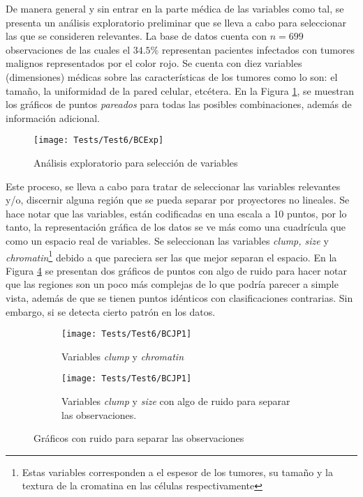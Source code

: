 \documentclass[../Main/Main.tex]{subfiles}
\begin{document}
De manera general y sin entrar en la parte médica de las variables como tal, se presenta un análisis exploratorio preliminar que se lleva a cabo para seleccionar las que se consideren relevantes. La base de datos cuenta con $n = 699$ observaciones de las cuales el $34.5\%$ representan pacientes infectados con tumores malignos representados por el color rojo. Se cuenta con diez variables (dimensiones) médicas sobre las características de los tumores como lo son: el tamaño, la uniformidad de la pared celular, etcétera. En la Figura \ref{fig:BCExp}, se muestran los gráficos de puntos \textit{pareados} para todas las posibles combinaciones, además de información adicional.
\begin{figure}[h]
	\centering
	\texttt{[image: Tests/Test6/BCExp]}
	\caption{Análisis exploratorio para selección de variables}
	\label{fig:BCExp}
\end{figure}
Este proceso, se lleva a cabo para tratar de seleccionar las variables relevantes y/o, discernir alguna región que se pueda separar por proyectores no lineales. Se hace notar que las variables, están codificadas en una escala a 10 puntos, por lo tanto, la representación gráfica de los datos se ve más como una cuadrícula que como un espacio real de variables. Se seleccionan las variables \textit{clump, size} y \textit{chromatin}\footnote{Estas variables corresponden a el espesor de los tumores, su tamaño y la textura de la cromatina en las células respectivamente} debido a que pareciera ser las que mejor separan el espacio. En la Figura \ref{fig:BCJP} se presentan dos gráficos de puntos con algo de ruido para hacer notar que las regiones son un poco más complejas de lo que podría parecer a simple vista, además de que se tienen puntos idénticos con clasificaciones contrarias. Sin embargo, si se detecta cierto patrón en los datos.
\begin{figure}[h]
        \centering
        \begin{subfigure}[b]{0.45\textwidth}
            \centering
            \texttt{[image: Tests/Test6/BCJP1]}
            \caption{Variables \textit{clump} y \textit{chromatin}}
			\label{fig:BCJP1}
        \end{subfigure}
        \hfill
        \begin{subfigure}[b]{0.45\textwidth}  
            \centering 
            \texttt{[image: Tests/Test6/BCJP1]}
            \caption{Variables \textit{clump} y \textit{size} con algo de ruido para separar las observaciones.}
			\label{fig:BCJP2}
        \end{subfigure}
		\caption{Gráficos con  ruido para separar las observaciones}
		\label{fig:BCJP}
\end{figure}
\end{document}

